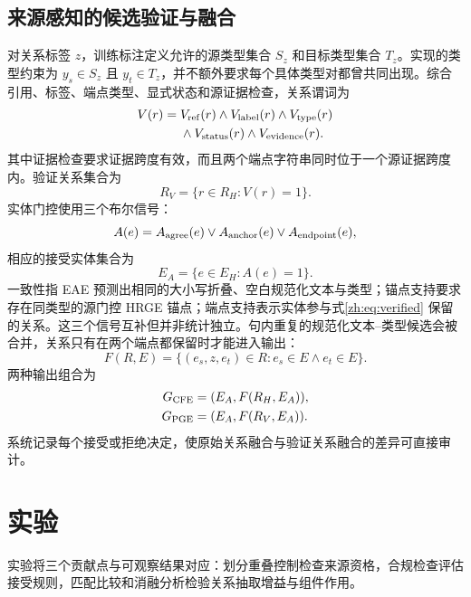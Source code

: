 \documentclass[UTF8,a4paper,twocolumn,10pt]{ctexart}
\begin{document}
\subsection{来源感知的候选验证与融合}
对关系标签 $z$，训练标注定义允许的源类型集合 $S_z$ 和目标类型集合 $T_z$。实现的类型约束为 $y_s\in S_z$ 且 $y_t\in T_z$，并不额外要求每个具体类型对都曾共同出现。综合引用、标签、端点类型、显式状态和源证据检查，关系谓词为
\begin{equation}
\begin{aligned}
V(r)={}&V_{\rm ref}(r)\land V_{\rm label}(r)\land V_{\rm type}(r)\\
&\land V_{\rm status}(r)\land V_{\rm evidence}(r).
\end{aligned}
\label{zh:eq:predicate}
\end{equation}
其中证据检查要求证据跨度有效，而且两个端点字符串同时位于一个源证据跨度内。验证关系集合为
\begin{equation}
R_V=\{r\in R_H:V(r)=1\}.
\label{zh:eq:verified}
\end{equation}
实体门控使用三个布尔信号：
\begin{equation}
A(e)=A_{\rm agree}(e)\lor A_{\rm anchor}(e)\lor A_{\rm endpoint}(e),
\label{zh:eq:accept}
\end{equation}
相应的接受实体集合为
\begin{equation}
E_A=\{e\in E_H:A(e)=1\}.
\label{zh:eq:accepted}
\end{equation}
一致性指 EAE 预测出相同的大小写折叠、空白规范化文本与类型；锚点支持要求存在同类型的源门控 HRGE 锚点；端点支持表示实体参与式\eqref{zh:eq:verified} 保留的关系。这三个信号互补但并非统计独立。句内重复的规范化文本--类型候选会被合并，关系只有在两个端点都保留时才能进入输出：
\begin{equation}
F(R,E)=\{(e_s,z,e_t)\in R:e_s\in E\land e_t\in E\}.
\label{zh:eq:endpoint}
\end{equation}
两种输出组合为
\begin{equation}
\begin{aligned}
G_{\rm CFE}&=(E_A,F(R_H,E_A)),\\
G_{\rm PGE}&=(E_A,F(R_V,E_A)).
\end{aligned}
\label{zh:eq:composition}
\end{equation}
系统记录每个接受或拒绝决定，使原始关系融合与验证关系融合的差异可直接审计。

\section{实验}
实验将三个贡献点与可观察结果对应：划分重叠控制检查来源资格，合规检查评估接受规则，匹配比较和消融分析检验关系抽取增益与组件作用。
\end{document}
